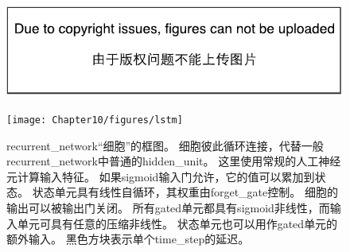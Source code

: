 
\begin{figure}[!htb]
\ifOpenSource
\centerline{\includegraphics{figure.pdf}}
\else
\centerline{\texttt{[image: Chapter10/figures/lstm]}}
\fi
\caption{\gls{recurrent_network}``细胞''的框图。
细胞彼此循环连接，代替一般\gls{recurrent_network}中普通的\gls{hidden_unit}。
这里使用常规的人工神经元计算输入特征。
如果sigmoid输入门允许，它的值可以累加到状态。
状态单元具有线性自循环，其权重由\gls{forget_gate}控制。
细胞的输出可以被输出门关闭。
所有\gls{gated}单元都具有sigmoid非线性，而输入单元可具有任意的压缩非线性。
状态单元也可以用作\gls{gated}单元的额外输入。
黑色方块表示单个\gls{time_step}的延迟。
}
\label{fig:chap10_lstm}
\end{figure}

